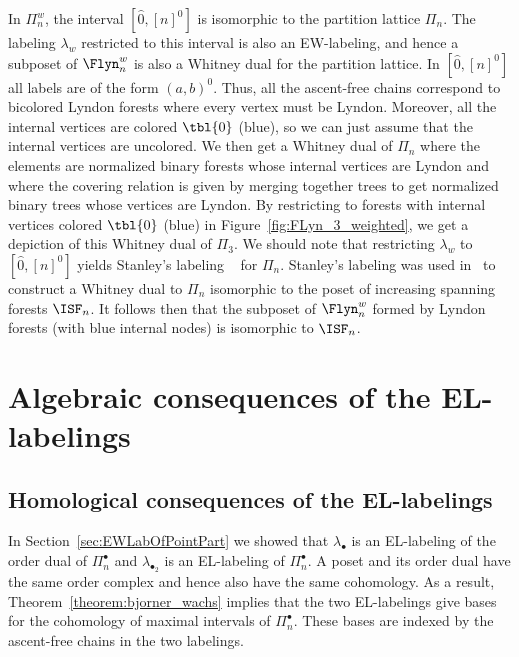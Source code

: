 \begin{rema}
In $\Pi_n^w$, the interval $[\hat{0}, [n]^0]$ is isomorphic to the partition lattice $\Pi_n$. The labeling $\lambda_w$ restricted to this interval is also an EW-labeling, and hence a subposet of $\Flyn_{n}^{w}$ is also a Whitney dual for the partition lattice.  In $[\hat{0}, [n]^0]$ all labels are of the form $(a,b)^0$. Thus, all the ascent-free chains correspond to  bicolored Lyndon forests where every vertex must be Lyndon.  Moreover, all the internal vertices are colored $\tbl{0}$ (blue), so we can just assume that the internal vertices are uncolored. We then get a Whitney dual of $\Pi_n$ where the elements are normalized binary forests whose internal vertices are Lyndon and where the covering relation is given by merging together trees to get normalized binary trees whose vertices are Lyndon. By restricting to forests with internal vertices colored $\tbl{0}$ (blue) in Figure~\ref{fig:FLyn_3_weighted}, we get a depiction of this Whitney dual of $\Pi_3$.  We should note that restricting $\lambda_w$ to $[\hat{0}, [n]^0]$ yields  Stanley's labeling ~\cite{Stanley1974} for $\Pi_n$.  Stanley's labeling  was used in~\cite[Corollary 5.7]{GonzalezHallam2021}  to construct a Whitney dual to $\Pi_n$ isomorphic to the poset of increasing spanning forests $\ISF_n$.  It follows then that the subposet of $\Flyn_{n}^{w}$ formed by Lyndon forests (with blue internal nodes) is isomorphic to $\ISF_n$. 



\end{rema}



\section{Algebraic consequences of the EL-labelings}\label{sec:algConseq}


 
\subsection{Homological consequences of the EL-labelings}
     In Section~\ref{sec:EWLabOfPointPart} we showed that $\lambda_{\bullet}$  is an EL-labeling of the order dual of $\Pi_n^\bullet$ and $\lambda_{\bullet_2}$ is an EL-labeling of $\Pi_n^\bullet$. A poset and its order dual have the same order complex and hence also have the same cohomology. As a result, Theorem~\ref{theorem:bjorner_wachs} implies that the two EL-labelings give bases for the cohomology of maximal intervals of $\Pi_n^\bullet$.  These bases are indexed by the ascent-free chains in the two labelings.  
     
